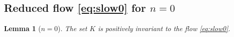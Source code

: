 \documentclass[a4paper,11pt]{article}
\newtheorem{lemma}{Lemma}[section]
\begin{document}
\subsection{Reduced flow \eqref{eq:slow0} for $n=0$}
\begin{lemma}[$n=0$] 
The set $K$ is positively invariant to the flow \eqref{eq:slow0}.
\end{lemma}
\end{document}
